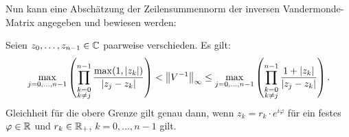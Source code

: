 Nun kann eine Abschätzung der Zeilensummennorm der inversen Vandermonde-Matrix
angegeben und bewiesen werden:
\begin{theorem}
  \label{thm:inverse_vandermonde_inequality}
  Seien $z_0, \dots, z_{n-1} \in \mathbb{C}$ paarweise verschieden.
  Es gilt:
  \begin{equation}
    \label{eq:inverse_vandermonde_inequality}
    \max_{j = 0, \dots, n-1} \left( \prod_{\substack{k = 0\\ k \neq j}}^{n-1} \frac{\max(1, \left\lvert z_k \right\rvert)}{\left\lvert z_j - z_k \right\rvert} \right)
    < \left\lVert V^{-1} \right\rVert_{\infty}
    \leq \max_{j = 0, \dots, n-1} \left( \prod_{\substack{k = 0\\ k \neq j}}^{n-1} \frac{1 + \left\lvert z_k \right\rvert}{\left\lvert z_j - z_k \right\rvert} \right).
  \end{equation}
  Gleichheit für die obere Grenze gilt genau dann, wenn $z_k = r_k \cdot e^{i \varphi}$
  für ein festes $\varphi \in \mathbb{R}$ und $r_k \in \mathbb{R}_{+}$, $k = 0, \dots, n-1$ gilt.
\end{theorem}

